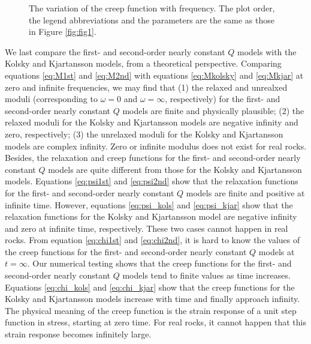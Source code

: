 \documentclass[article]{./macros/elsarticle_qh}
\begin{document}
\begin{figure}[H]
\centering
{}
\caption{
The variation of the creep function with frequency. The plot order, the legend abbreviations and the parameters are the same as those in Figure \ref{fig:fig1}. 
}
\label{fig:fig4}
\end{figure}

We last compare the first- and second-order nearly constant $Q$ models with the Kolsky and Kjartansson models, from a theoretical perspective.  
Comparing equations \ref{eq:M1st} and \ref{eq:M2nd} with equations \ref{eq:Mkolsky} and \ref{eq:Mkjar} at zero and infinite frequencies, we may find that (1) the relaxed and unrealxed moduli (corresponding to $\omega=0$ and $\omega=\infty$, respectively) for the first- and second-order nearly constant $Q$ models are finite and physically plausible; (2) the relaxed moduli for the Kolsky and Kjartansson models are negative infinity and zero, respectively; (3) the unrelaxed moduli for the Kolsky and Kjartansson models are complex infinity. Zero or infinite modulus does not exist for real rocks. Besides, the relaxation and creep functions for the first- and second-order nearly constant $Q$ models are quite different from those for the Kolsky and Kjartansson models. Equations \ref{eq:psi1st} and \ref{eq:psi2nd} show that the relaxation functions for the first- and second-order nearly constant $Q$ models are finite and positive at infinite time. However, equations \ref{eq:psi_kols} and \ref{eq:psi_kjar} show that the relaxation functions for the Kolsky and Kjartansson model are negative infinity and zero at infinite time, respectively. These two cases cannot happen in real rocks. From equation \ref{eq:chi1st} and \ref{eq:chi2nd}, it is hard to know the values of the creep functions for the first- and second-order nearly constant $Q$ models at $t=\infty$. Our numerical testing shows that the creep functions for the first- and second-order nearly constant $Q$ models tend to finite values as time increases. 
Equations \ref{eq:chi_kols} and \ref{eq:chi_kjar} show that the creep functions for the Kolsky and Kjartansson models increase with time and finally approach infinity. 
The physical meaning of the creep function is the strain response of a unit step function in stress, starting at zero time. 
For real rocks, it cannot happen that this strain response becomes infinitely large.
\end{document}
